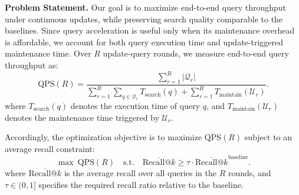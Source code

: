 \noindent\textbf{Problem Statement.}
Our goal is to maximize end-to-end query throughput under continuous updates, while preserving search quality comparable to the baselines. Since query acceleration is useful only when its maintenance overhead is affordable, we account for both query execution time and update-triggered maintenance time. Over $R$ update-query rounds, we measure end-to-end query throughput as:
\begin{equation}
\mathrm{QPS}(R) =
\frac{\sum_{r=1}^{R} |\mathcal{Q}_r|}
{
\sum_{r=1}^{R}\sum_{q\in\mathcal{Q}_r} T_{\mathrm{search}}(q)
+
\sum_{r=1}^{R} T_{\mathrm{maintain}}(\mathcal{U}_r)
}.
\end{equation}
where $T_{\mathrm{search}}(q)$ denotes the execution time of query $q$, and $T_{\mathrm{maintain}}(\mathcal{U}_r)$ denotes the maintenance time triggered by $\mathcal{U}_r$.


Accordingly, the optimization objective is to maximize $\mathrm{QPS}(R)$ subject to an average recall constraint:
\begin{equation}
\max \ \mathrm{QPS}(R)
\quad
\text{s.t.} \quad
\overline{\mathrm{Recall@}k}
\ge
\tau \cdot \overline{\mathrm{Recall@}k}^{\mathrm{baseline}}.
\end{equation}
where $\overline{\mathrm{Recall@}k}$ is the average recall over all queries in the $R$ rounds, and $\tau \in (0,1]$ specifies the required recall ratio relative to the baseline.

